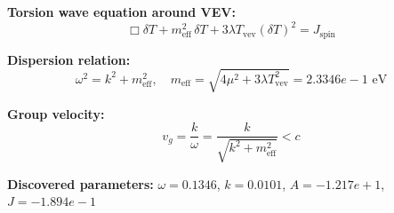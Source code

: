 
\textbf{Torsion wave equation around VEV:}
\begin{equation}
  \Box \delta T + m_{\text{eff}}^2 \, \delta T + 3\lambda T_{\text{vev}} (\delta T)^2 = J_{\text{spin}}
\end{equation}

\textbf{Dispersion relation:}
\begin{equation}
  \omega^2 = k^2 + m_{\text{eff}}^2, \quad
  m_{\text{eff}} = \sqrt{4\mu^2 + 3\lambda T_{\text{vev}}^2} = 2.3346e-1 \text{ eV}
\end{equation}

\textbf{Group velocity:}
\begin{equation}
  v_g = \frac{k}{\omega} = \frac{k}{\sqrt{k^2 + m_{\text{eff}}^2}} < c
\end{equation}

\textbf{Discovered parameters:}
$\omega = 0.1346$, \quad
$k = 0.0101$, \quad
$A = -1.217e+1$, \quad
$J = -1.894e-1$